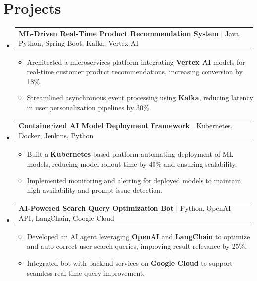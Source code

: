 \documentclass[letterpaper,11pt]{article}
\makeatletter
\newcommand{\resumeItem}[1]{
  \item\footnotesize{
    {#1 \vspace{-2pt}}
  }
}
\newcommand{\resumeProjectHeading}[2]{
    \item
    \begin{tabular*}{1.001\textwidth}{l@{\extracolsep{\fill}}r}
      \small#1 & \textbf{\small #2}\\
    \end{tabular*}\vspace{-7pt}
}
\newcommand{\resumeSubHeadingListStart}{\begin{itemize}[leftmargin=0pt, label={}]}
\newcommand{\resumeSubHeadingListEnd}{\end{itemize}}
\newcommand{\resumeItemListStart}{\begin{itemize}[leftmargin=*]}
\newcommand{\resumeItemListEnd}{\end{itemize}\vspace{-5pt}}
\makeatother
\begin{document}
\section{Projects}
    \vspace{-5pt}
    \resumeSubHeadingListStart
          \resumeProjectHeading
              {\textbf{ML-Driven Real-Time Product Recommendation System} | Java, Python, Spring Boot, Kafka, Vertex AI}{}
        \resumeItemListStart
            \resumeItem{Architected a microservices platform integrating \textbf{Vertex AI} models for real-time customer product recommendations, increasing conversion by 18\%.}
            \resumeItem{Streamlined asynchronous event processing using \textbf{Kafka}, reducing latency in user personalization pipelines by 30\%.}
        \resumeItemListEnd
        \vspace{-12pt}
    
    \resumeProjectHeading
        {\textbf{Containerized AI Model Deployment Framework} | Kubernetes, Docker, Jenkins, Python}{}
        \resumeItemListStart
            \resumeItem{Built a \textbf{Kubernetes}-based platform automating deployment of ML models, reducing model rollout time by 40\% and ensuring scalability.}
            \resumeItem{Implemented monitoring and alerting for deployed models to maintain high availability and prompt issue detection.}
        \resumeItemListEnd
          \vspace{-12pt}
      \resumeProjectHeading
          {\textbf{AI-Powered Search Query Optimization Bot} | Python, OpenAI API, LangChain, Google Cloud}{}
          \resumeItemListStart
              \resumeItem{Developed an AI agent leveraging \textbf{OpenAI} and \textbf{LangChain} to optimize and auto-correct user search queries, improving result relevance by 25\%.}
              \resumeItem{Integrated bot with backend services on \textbf{Google Cloud} to support seamless real-time query improvement.}
          \resumeItemListEnd 
    \resumeSubHeadingListEnd
\end{document}
